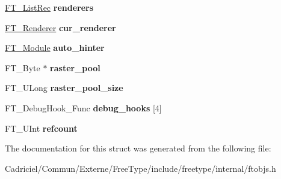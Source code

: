 \begin{DoxyCompactItemize}
\item 
\hypertarget{struct_f_t___library_rec___ad9503f71cf4e4d88edfbdda59eb5e43d}{\hyperlink{struct_f_t___list_rec__}{F\-T\-\_\-\-List\-Rec} {\bfseries renderers}}\label{struct_f_t___library_rec___ad9503f71cf4e4d88edfbdda59eb5e43d}

\item 
\hypertarget{struct_f_t___library_rec___a528dd3298756070ecad7d0f82f009294}{\hyperlink{struct_f_t___renderer_rec__}{F\-T\-\_\-\-Renderer} {\bfseries cur\-\_\-renderer}}\label{struct_f_t___library_rec___a528dd3298756070ecad7d0f82f009294}

\item 
\hypertarget{struct_f_t___library_rec___ae608b33b223905d4d70b782ed7ec8c78}{\hyperlink{struct_f_t___module_rec__}{F\-T\-\_\-\-Module} {\bfseries auto\-\_\-hinter}}\label{struct_f_t___library_rec___ae608b33b223905d4d70b782ed7ec8c78}

\item 
\hypertarget{struct_f_t___library_rec___aa8dd799d2efb7817b05c4a02a6828275}{F\-T\-\_\-\-Byte $\ast$ {\bfseries raster\-\_\-pool}}\label{struct_f_t___library_rec___aa8dd799d2efb7817b05c4a02a6828275}

\item 
\hypertarget{struct_f_t___library_rec___a798afdcaf0cda349eb454b769abfa251}{F\-T\-\_\-\-U\-Long {\bfseries raster\-\_\-pool\-\_\-size}}\label{struct_f_t___library_rec___a798afdcaf0cda349eb454b769abfa251}

\item 
\hypertarget{struct_f_t___library_rec___a1ba1f5abd0254a22dae533a9ac971b84}{F\-T\-\_\-\-Debug\-Hook\-\_\-\-Func {\bfseries debug\-\_\-hooks} \mbox{[}4\mbox{]}}\label{struct_f_t___library_rec___a1ba1f5abd0254a22dae533a9ac971b84}

\item 
\hypertarget{struct_f_t___library_rec___aad71b1ecfaea56594fbd21c18e72f15c}{F\-T\-\_\-\-U\-Int {\bfseries refcount}}\label{struct_f_t___library_rec___aad71b1ecfaea56594fbd21c18e72f15c}

\end{DoxyCompactItemize}


The documentation for this struct was generated from the following file\-:\begin{DoxyCompactItemize}
\item 
Cadriciel/\-Commun/\-Externe/\-Free\-Type/include/freetype/internal/ftobjs.\-h\end{DoxyCompactItemize}
